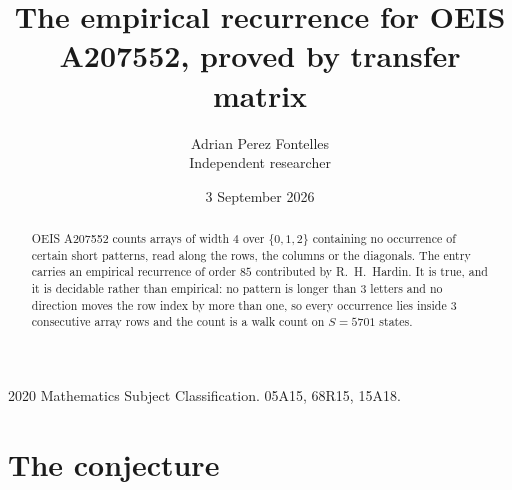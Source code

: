 \documentclass[11pt,a4paper]{article}
\title{The empirical recurrence for OEIS A207552, proved by transfer matrix}
\author{Adrian Perez Fontelles\\ \small Independent researcher}
\date{3 September 2026}
\theoremstyle{plain}
\theoremstyle{definition}
\begin{document}
\maketitle

\begin{abstract}
OEIS A207552 counts arrays of width $4$ over $\{0,1,2\}$ containing no occurrence of certain short
patterns, read along the rows, the columns or the diagonals. The entry carries an empirical
recurrence of order $85$ contributed by R.~H.~Hardin. It is true, and it is decidable
rather than empirical: no pattern is longer than $3$ letters and no direction moves the row
index by more than one, so every occurrence lies inside $3$ consecutive array rows and the
count is a walk count on $S=5701$ states.
\end{abstract}

\noindent\small 2020 Mathematics Subject Classification. 05A15, 68R15, 15A18.\normalsize

\section{The conjecture}
\end{document}

